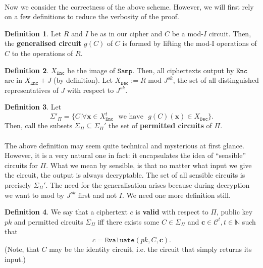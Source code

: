 \documentclass{article}
\theoremstyle{definition}
\newtheorem{definition}{Definition}[section]
\theoremstyle{example}
\newcommand{\Enc}{\texttt{Enc}}
\newcommand{\Dec}{\texttt{Dec}}
\newcommand{\Evaluate}{\texttt{Evaluate}}
\renewcommand{\C}{\mathcal{C}}
\newcommand{\Nat}{\mathbb{N}}
\renewcommand{\mod}{\,\,\text{mod}\,\,}
\newcommand{\Samp}{\texttt{Samp}}
\renewcommand{\vec}[1]{\mathbf{#1}}
\begin{document}
\paragraph{} Now we consider the correctness of the above scheme. However, we
will first rely on a few definitions to reduce the verbosity of the proof.
\begin{definition}
  Let $R$ and $I$ be as in our cipher and $C$ be a mod-$I$ circuit. Then, the \textbf{generalised circuit} $g(C)$ of
  $C$ is formed by lifting the mod-I operations of $C$ to the operations of $R$.
\end{definition}
\begin{definition}
  $X_\Enc$ be the image of $\Samp$. Then, all ciphertexts output by $\Enc$
  are in $X_\Enc + J$ (by definition). Let $X_\Dec := R \mod J^{sk}$, the set of
  all distinguished representatives of $J$ with respect to $J^{sk}$.  
\end{definition}
\begin{definition}
\label{def:perm_circuits}
  Let
  \[
    \Sigma'_\Pi = \{C | \forall \vec{x} \in X_\Enc^t \,\,\text{ we have }\,\,
    g(C)(\vec{x}) \in X_\Dec\}.
  \]
  Then, call the subsets $\Sigma_\Pi \subseteq \Sigma_\Pi'$ the set of \textbf{permitted
  circuits} of $\Pi$.
\end{definition}
\paragraph{} The above definition may seem quite technical and mysterious at
first glance. However, it is a very natural one in fact: it encapsulates the
idea of ``sensible'' circuits for $\Pi$. What we mean by sensible, is that no matter
what input we give the circuit, the output is always decryptable. The set of all
sensible circuits is precisely $\Sigma_\Pi'$. The need for the generalisation arises
because during decryption we want to mod by $J^{sk}$ first and not $I$. We need
one more definition still.
\begin{definition}
  We say that a ciphertext $c$ is \textbf{valid} with respect to $\Pi$, public
  key $pk$ and permitted circuits $\Sigma_\Pi$ iff there exists some $C \in \Sigma_\Pi$
  and $\vec{c} \in \C^t, t \in \Nat$ such that
  \[
    c = \Evaluate(pk, C, \vec{c}).
  \]
  (Note, that $C$ may be the identity circuit, i.e. the circuit that simply
  returns its input.)
\end{definition}
\end{document}
